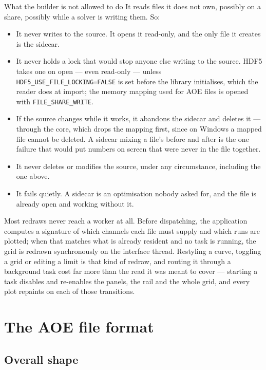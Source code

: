 \documentclass[11pt,a4paper,oneside]{report}
\newcommand{\code}[1]{\texttt{#1}}
\begin{document}
\begin{aoenote}{What the builder is not allowed to do}
It reads files it does not own, possibly on a share, possibly while a solver is
writing them. So:

\begin{itemize}
  \item It never writes to the source. It opens it read-only, and the only file
        it creates is the sidecar.
  \item It never holds a lock that would stop anyone else writing to the
        source. HDF5 takes one on open --- even read-only --- unless
        \code{HDF5\_USE\_FILE\_LOCKING=FALSE} is set before the library
        initialises, which the reader does at import; the memory mapping used
        for AOE files is opened with \code{FILE\_SHARE\_WRITE}.
  \item If the source changes while it works, it abandons the sidecar and
        deletes it --- through the core, which drops the mapping first, since on
        Windows a mapped file cannot be deleted. A sidecar mixing a file's
        before and after is the one failure that would put numbers on screen
        that were never in the file together.
  \item It never deletes or modifies the source, under any circumstance,
        including the one above.
  \item It fails quietly. A sidecar is an optimisation nobody asked for, and
        the file is already open and working without it.
\end{itemize}
\end{aoenote}

Most redraws never reach a worker at all. Before dispatching, the application
computes a signature of which channels each file must supply and which runs are
plotted; when that matches what is already resident and no task is running, the
grid is redrawn synchronously on the interface thread. Restyling a curve,
toggling a grid or editing a limit is that kind of redraw, and routing it through
a background task cost far more than the read it was meant to cover --- starting
a task disables and re-enables the panels, the rail and the whole grid, and every
plot repaints on each of those transitions.

\chapter{The AOE file format}

\section{Overall shape}
\end{document}
